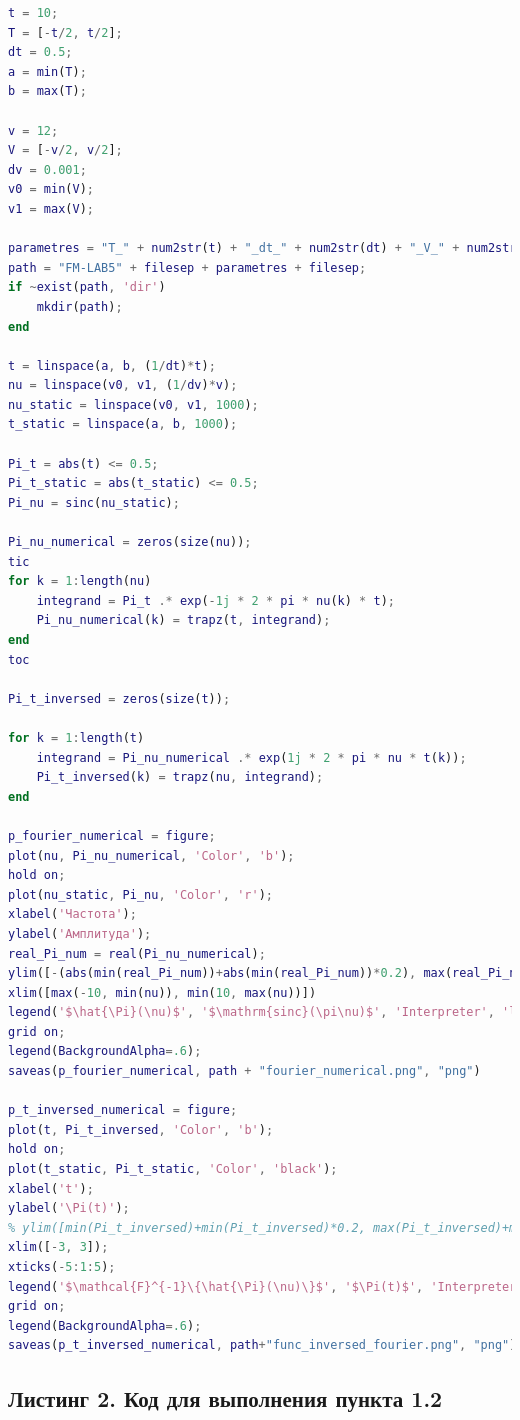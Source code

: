 \documentclass[a4paper]{article}
\begin{document}
\begin{lstlisting}[caption={Код для построения графиков для пункта 1.1}, language=matlab]
t = 10;
T = [-t/2, t/2];
dt = 0.5;
a = min(T);
b = max(T);

v = 12;
V = [-v/2, v/2];
dv = 0.001;
v0 = min(V);
v1 = max(V);

parametres = "T_" + num2str(t) + "_dt_" + num2str(dt) + "_V_" + num2str(v) + "_dv_"+ num2str(dv);
path = "FM-LAB5" + filesep + parametres + filesep;
if ~exist(path, 'dir')
    mkdir(path);
end

t = linspace(a, b, (1/dt)*t);
nu = linspace(v0, v1, (1/dv)*v);
nu_static = linspace(v0, v1, 1000);
t_static = linspace(a, b, 1000);

Pi_t = abs(t) <= 0.5;
Pi_t_static = abs(t_static) <= 0.5;
Pi_nu = sinc(nu_static);

Pi_nu_numerical = zeros(size(nu));
tic
for k = 1:length(nu)
    integrand = Pi_t .* exp(-1j * 2 * pi * nu(k) * t);
    Pi_nu_numerical(k) = trapz(t, integrand);
end
toc

Pi_t_inversed = zeros(size(t));

for k = 1:length(t)
    integrand = Pi_nu_numerical .* exp(1j * 2 * pi * nu * t(k));
    Pi_t_inversed(k) = trapz(nu, integrand);
end

p_fourier_numerical = figure;
plot(nu, Pi_nu_numerical, 'Color', 'b');
hold on;
plot(nu_static, Pi_nu, 'Color', 'r');
xlabel('Частота');
ylabel('Амплитуда');
real_Pi_num = real(Pi_nu_numerical);
ylim([-(abs(min(real_Pi_num))+abs(min(real_Pi_num))*0.2), max(real_Pi_num)+max(real_Pi_num)*0.2])
xlim([max(-10, min(nu)), min(10, max(nu))])
legend('$\hat{\Pi}(\nu)$', '$\mathrm{sinc}(\pi\nu)$', 'Interpreter', 'latex', 'fontsize', 11)
grid on;
legend(BackgroundAlpha=.6);
saveas(p_fourier_numerical, path + "fourier_numerical.png", "png")

p_t_inversed_numerical = figure;
plot(t, Pi_t_inversed, 'Color', 'b');
hold on;
plot(t_static, Pi_t_static, 'Color', 'black');
xlabel('t');
ylabel('\Pi(t)');
% ylim([min(Pi_t_inversed)+min(Pi_t_inversed)*0.2, max(Pi_t_inversed)+max(Pi_t_inversed)*0.2])
xlim([-3, 3]);
xticks(-5:1:5);
legend('$\mathcal{F}^{-1}\{\hat{\Pi}(\nu)\}$', '$\Pi(t)$', 'Interpreter', 'latex', 'fontsize', 11)
grid on;
legend(BackgroundAlpha=.6);
saveas(p_t_inversed_numerical, path+"func_inversed_fourier.png", "png")
\end{lstlisting}

\subsection*{Листинг 2. Код для выполнения пункта 1.2}
\end{document}
